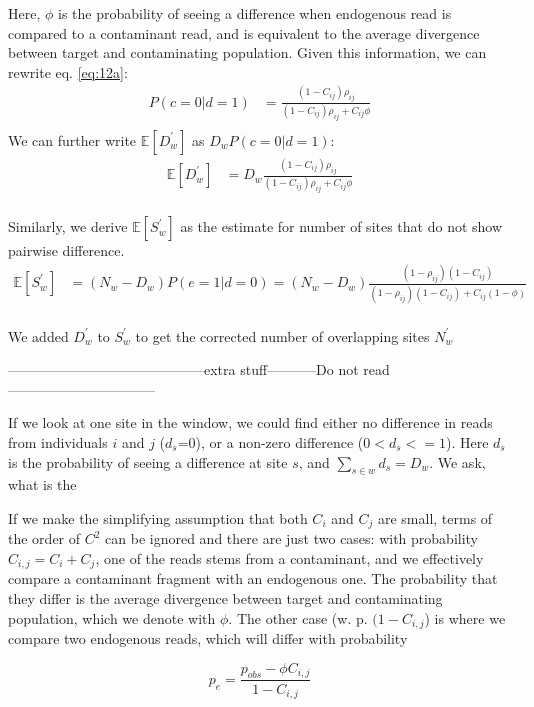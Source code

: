 \documentclass[12pt, letterpaper]{article}
\begin{document}
Here, $\phi$ is the probability of seeing a difference when endogenous read is compared to a contaminant read, and is equivalent to the average divergence between target and contaminating population.
Given this information, we can rewrite eq. \ref{eq:12a}:
\begin{align}\label{eq:12}
    P(c=0|d=1) &= \frac{(1 - C_{ij}) \rho_{ij}}{(1 - C_{ij}) \rho_{ij} + C_{ij} \phi} \nonumber\\
\end{align}
We can further write $\mathbb{E}[D_w^{'}]$ as $D_w P(c=0|d=1)$:
\begin{align}
    \mathbb{E}[D_w^{'}] &= D_w\frac{(1-C_{ij})\rho_{ij}}{(1-C_{ij}) \rho_{ij} + C_{ij} \phi}\\
\end{align}

Similarly, we derive $\mathbb{E}[S_w^{'}]$ as the estimate for number of sites that do not show pairwise difference.
\begin{align}
    \mathbb{E}[S_w^{'}] &= (N_w-D_w) P(e=1|d=0) = (N_w - D_w)\frac{(1-\rho_{ij})(1-C_{ij})}{(1-\rho_{ij})(1-C_{ij}) + C_{ij}(1-\phi)}\\
\end{align}

We added $D_w^{'}$ to $S_w^{'}$ to get the corrected number of overlapping sites $N_w^{'}$  

------------------------------------------extra stuff-----------Do not read--------------------------------


If we look at one site in the window, we could find either no difference in reads from individuals $i$ and $j$ ($d_s$=0), or a non-zero difference ($0<d_s<=1$). Here $d_s$ is the probability of seeing a difference at site $s$, and $\sum_{s \in w} d_s =D_w$. We ask, what is the    

If we make the simplifying assumption that both $C_i$ and $C_j$ are small, terms of the order of $C^2$ can be ignored and there are just two cases: with probability $C_{i,j} =C_i + C_j$, one of the reads stems from a contaminant, and we effectively compare a contaminant fragment with an endogenous one. The probability that they differ is the average divergence between target and contaminating population, which we denote with $\phi$. The other case (w. p. $(1-C_{i,j}$) is where we compare two endogenous reads, which will differ with probability

\begin{equation}
    p_{e} = \frac{p_{obs}-\phi C_{i,j}}{1-C_{i,j}}
\end{equation}
\end{document}
